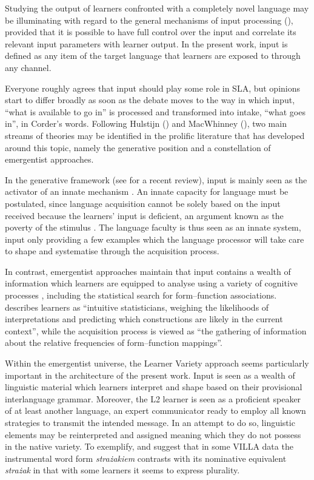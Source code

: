 Studying the output of learners confronted with a completely novel language may be illuminating with regard to the general mechanisms of input processing (\citealt{Perdue2002}), provided that it is possible to have full control over the input and correlate its relevant input parameters with learner output. In the present work, input is defined as any item of the target language that learners are exposed to through any channel.

Everyone roughly agrees that input should play some role in SLA, but opinions start to differ broadly as soon as the debate moves to the way in which input, “what is available to go in” is processed and transformed into intake, “what goes in”, in Corder's \citeyear{Corder1967} words. Following Hulstijn (\citeyear{Hulstijn2015}) and MacWhinney (\citeyear{kail_tale_2010,macwhinney_language_2015}), two main streams of theories may be identified in the prolific literature that has developed around this topic, namely the generative position and a constellation of emergentist approaches.

In the generative framework (see \citealt{RankinUnsworth2016} for a recent review), input is mainly seen as the activator of an innate mechanism \citep{Chomsky1981}. An innate capacity for language must be postulated, since language acquisition cannot be solely based on the input received because the learners’ input is deficient, an argument known as the poverty of the stimulus \citep{Chomsky1980}. The language faculty is thus seen as an innate system, input only providing a few examples which the language processor will take care to shape and systematise through the acquisition process.

In contrast, emergentist approaches maintain that input contains a wealth of information which learners are equipped to analyse using a variety of cognitive processes \citep{Tomasello2005}, including the statistical search for form–function associations.  \citet[1]{Ellis2006b} describes learners as “intuitive statisticians, weighing the likelihoods of interpretations and predicting which constructions are likely in the current context”, while the acquisition process is viewed as “the gathering of information about the relative frequencies of form–function mappings”. 

Within the emergentist universe, the Learner Variety approach seems particularly important in the architecture of the present work. Input is seen as a wealth of linguistic material which learners interpret and shape based on their provisional interlanguage grammar. Moreover, the L2 learner is seen as a proficient speaker of at least another language, an expert communicator ready to employ all known strategies to transmit the intended message. In an attempt to do so, linguistic elements may be reinterpreted and assigned meaning which they do not possess in the native variety. To exemplify, \citet{Bernini2018} and \citet[28--33]{Dimroth2018} suggest that in some VILLA data the instrumental word form \textit{strażakiem} contrasts with its nominative equivalent \textit{strażak} in that with some learners it seems to express plurality.

